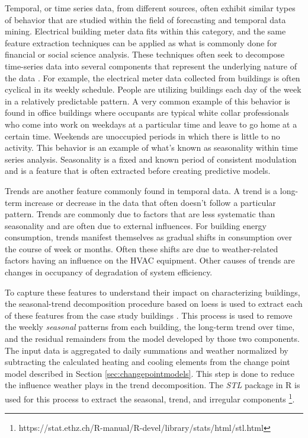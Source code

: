 Temporal, or time series data, from different sources, often exhibit similar types of behavior that are studied within the field of forecasting and temporal data mining. Electrical building meter data fits within this category, and the same feature extraction techniques can be applied as what is commonly done for financial or social science analysis. These techniques often seek to decompose time-series data into several components that represent the underlying nature of the data \citep{Mitsa_2010}. For example, the electrical meter data collected from buildings is often cyclical in its weekly schedule. People are utilizing buildings each day of the week in a relatively predictable pattern. A very common example of this behavior is found in office buildings where occupants are typical white collar professionals who come into work on weekdays at a particular time and leave to go home at a certain time. Weekends are unoccupied periods in which there is little to no activity. This behavior is an example of what's known as seasonality within time series analysis. Seasonality is a fixed and known period of consistent modulation and is a feature that is often extracted before creating predictive models. 

Trends are another feature commonly found in temporal data. A trend is a long-term increase or decrease in the data that often doesn't follow a particular pattern. Trends are commonly due to factors that are less systematic than seasonality and are often due to external influences. For building energy consumption, trends manifest themselves as gradual shifts in consumption over the course of week or months. Often these shifts are due to weather-related factors having an influence on the HVAC equipment. Other causes of trends are changes in occupancy of degradation of system efficiency. 

To capture these features to understand their impact on characterizing buildings, the seasonal-trend decomposition procedure based on loess is used to extract each of these features from the case study buildings \citep{cleveland1990stl}. This process is used to remove the weekly \emph{seasonal} patterns from each building, the long-term trend over time, and the residual remainders from the model developed by those two components. The input data is aggregated to daily summations and weather normalized by subtracting the calculated heating and cooling elements from the change point model described in Section \ref{sec:changepointmodels}. This step is done to reduce the influence weather plays in the trend decomposition. The \emph{STL} package in R is used for this process to extract the seasonal, trend, and irregular components \footnote{https://stat.ethz.ch/R-manual/R-devel/library/stats/html/stl.html}. 

